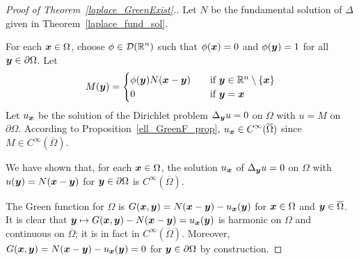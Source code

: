 \begin{proof}[Proof of Theorem~\ref{laplace_GreenExist}.]
Let $N$ be the fundamental solution of $\Delta$ given in
Theorem~\ref{laplace_fund_sol}.

 For each ${\bm{x}} \in \Omega$, choose
$\displaystyle \phi \in \mathcal{D}(\mathbb{R}^n)$ such that $\phi({\bm{x}})=0$ and
$\phi({\bm{y}}) = 1$ for all ${\bm{y}} \in \partial \Omega$.  Let
\[
M({\bm{y}}) =
\begin{cases}
\phi({\bm{y}})N({\bm{x}}-{\bm{y}}) & \quad \text{if} \ {\bm{y}} \in
\mathbb{R}^n\setminus \{{\bm{x}}\} \\
0 & \quad \text{if} \ {\bm{y}} = {\bm{x}}
\end{cases}
\]
Let $u_{{\bm{x}}}$ be the solution of the Dirichlet problem
$\Delta_{{\bm{y}}} u = 0$ on $\Omega$ with $u = M$ on $\partial \Omega$.
According to Proposition~\ref{ell_GreenF_prop},
$\displaystyle u_{{\bm{x}}} \in C^\infty(\overline{\Omega})$ since
$\displaystyle M \in C^\infty(\overline{\Omega})$.

We have shown that, for each ${\bm{x}} \in \Omega$, the solution
$u_{{\bm{x}}}$ of $\Delta_{{\bm{y}}} u = 0$ on $\Omega$ with
$u({\bm{y}}) = N({\bm{x}}-{\bm{y}})$
for ${\bm{y}} \in \partial \Omega$ is
$\displaystyle C^\infty(\overline{\Omega})$.

 The Green function for $\Omega$ is
$\displaystyle G({\bm{x}},{\bm{y}}) = N({\bm{x}}-{\bm{y}})
- u_{{\bm{x}}}({\bm{y}})$ for ${\bm{x}} \in \Omega$ and
${\bm{y}} \in \overline{\Omega}$.
It is clear that
${\bm{y}} \mapsto G({\bm{x}},{\bm{y}}) - N({\bm{x}}-{\bm{y}}) =
u_{{\bm{x}}}({\bm{y}})$ is harmonic on $\Omega$ and continuous on
$\overline{\Omega}$; it is in fact in
$\displaystyle C^\infty(\overline{\Omega})$.
Moreover,
$G({\bm{x}},{\bm{y}}) = N({\bm{x}}-{\bm{y}}) - u_{{\bm{x}}}({\bm{y}}) = 0$
for ${\bm{y}} \in \partial \Omega$ by construction.
\end{proof}


